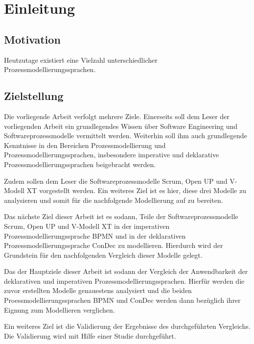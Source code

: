 \chapter{Einleitung}\label{sec:chapter1}



\section{Motivation}
Heutzutage existiert eine Vielzahl unterschiedlicher Prozessmodellierungssprachen.


\section{Zielstellung}

Die vorliegende Arbeit verfolgt mehrere Ziele. Einerseits soll dem Leser der vorliegenden Arbeit ein grundlegendes Wissen über Software Engineering und Softwareprozessmodelle vermittelt werden. Weiterhin soll ihm auch grundlegende Kenntnisse in den Bereichen Prozessmodellierung und Prozessmodellierungssprachen, insbesondere imperative und deklarative Prozessmodellierungssprachen beigebracht werden. \newline

Zudem sollen dem Leser die Softwareprozessmodelle Scrum, Open UP und V-Modell XT vorgestellt werden. Ein weiteres Ziel ist es hier, diese drei Modelle zu analysieren und somit für die nachfolgende Modellierung auf zu bereiten.\newline

Das nächste Ziel dieser Arbeit ist es sodann, Teile der Softwareprozessmodelle Scrum, Open UP und V-Modell XT in der imperativen Prozessmodellierungssprache BPMN und in der deklarativen Prozessmodellierungssprache ConDec zu modellieren. Hierdurch wird der Grundstein für den nachfolgenden Vergleich dieser Modelle gelegt.\newline

Das der Hauptziele dieser Arbeit ist sodann der Vergleich der Anwendbarkeit der deklarativen und imperativen Prozessmodellierungssprachen. Hierfür werden die zuvor erstellten Modelle genauestens analysiert und die beiden Proessmodellierungssprachen BPMN und ConDec werden dann bezüglich ihrer Eignung zum Modellieren verglichen.\newline

Ein weiteres Ziel ist die Validierung der Ergebnisse des durchgeführten Vergleichs. Die Validierung wird mit Hilfe einer Studie durchgeführt.\newline





